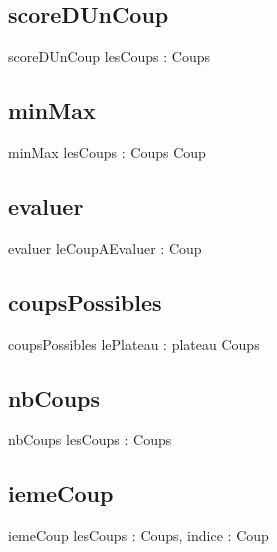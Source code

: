 \documentclass{article}
\begin{document}
	\subsection{scoreDUnCoup}
\begin{algorithme}
	\signaturefonction
	{scoreDUnCoup}
	{lesCoups : Coups}
	{\naturel}
\end{algorithme}
	\subsection{minMax}
\begin{algorithme}
	\signaturefonction
	{minMax}
	{lesCoups : Coups}
	{Coup}
\end{algorithme}

	\subsection{evaluer}
\begin{algorithme}
	\signaturefonction
	{evaluer}
	{leCoupAEvaluer : Coup}
	{\naturel}
\end{algorithme}

	\subsection{coupsPossibles}
\begin{algorithme}
	\signaturefonction
	{coupsPossibles}
	{lePlateau : plateau}
	{Coups}
\end{algorithme}

	\subsection{nbCoups}
\begin{algorithme}
	\signaturefonction
	{nbCoups}
	{lesCoups : Coups}
	{\naturel}
\end{algorithme}

	\subsection{iemeCoup}
\begin{algorithme}
	\signaturefonction
	{iemeCoup}
	{lesCoups : Coups, indice : \naturelNonNul}
	{Coup}
\end{algorithme}
\end{document}
